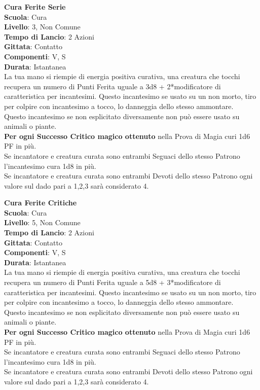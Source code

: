 \begin{multicols}{2}
\medskip\textbf{Cura Ferite Serie}\\
\textbf{Scuola}: Cura\\
\textbf{Livello}: 3, Non Comune\\
\textbf{Tempo di Lancio}: 2 Azioni\\
\textbf{Gittata}: Contatto\\
\textbf{Componenti}: V, S\\
\textbf{Durata}: Istantanea\\
La tua mano si riempie di energia positiva curativa, una creatura che tocchi recupera un numero di Punti Ferita uguale a 3d8 + 2*modificatore di caratteristica per incantesimi. Questo incantesimo se usato su un non morto, tiro per colpire con incantesimo a tocco, lo danneggia dello stesso ammontare.\\
Questo incantesimo se non esplicitato diversamente non può essere usato su animali o piante.\\
\textbf{Per ogni Successo Critico magico ottenuto} nella Prova di Magia curi 1d6 PF in più.\\
Se incantatore e creatura curata sono entrambi Seguaci dello stesso Patrono l'incantesimo cura 1d8 in più.\\
Se incantatore e creatura curata sono entrambi Devoti dello stesso Patrono ogni valore sul dado pari a 1,2,3 sarà considerato 4.

\medskip\textbf{Cura Ferite Critiche}\\
\textbf{Scuola}: Cura\\
\textbf{Livello}: 5, Non Comune\\
\textbf{Tempo di Lancio}: 2 Azioni\\
\textbf{Gittata}: Contatto\\
\textbf{Componenti}: V, S\\
\textbf{Durata}: Istantanea\\
La tua mano si riempie di energia positiva curativa, una creatura che tocchi recupera un numero di Punti Ferita uguale a 5d8 + 3*modificatore di caratteristica per incantesimi. Questo incantesimo se usato su un non morto, tiro per colpire con incantesimo a tocco, lo danneggia dello stesso ammontare.\\
Questo incantesimo se non esplicitato diversamente non può essere usato su animali o piante.\\
\textbf{Per ogni Successo Critico magico ottenuto} nella Prova di Magia curi 1d6 PF in più.\\
Se incantatore e creatura curata sono entrambi Seguaci dello stesso Patrono l'incantesimo cura 1d8 in più.\\
Se incantatore e creatura curata sono entrambi Devoti dello stesso Patrono ogni valore sul dado pari a 1,2,3 sarà considerato 4.


\end{multicols}

